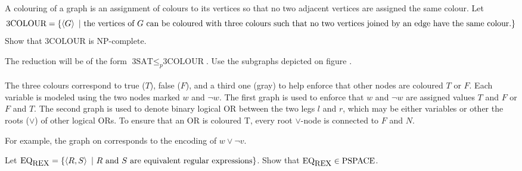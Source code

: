 \documentclass{article}
\begin{document}
\begin{exercise}
A colouring of a graph is an assignment of colours to its vertices so that no two adjacent vertices are assigned the same colour. Let
\begin{equation}
\mbox{3COLOUR}=\left\{ \left\langle G \right\rangle\ |\ \mbox{the vertices of $G$ can be coloured with three colours such that no two vertices joined by an edge have the same colour.} \right\}
\end{equation}
Show that $\mbox{3COLOUR}$ is $\mbox{NP-complete}$.
\begin{hint}
The reduction will be of the form $\mbox{3SAT}\leq_p\mbox{3COLOUR}$. Use the subgraphs depicted on figure \figref{}.
\paragraph{}
The three colours correspond to true ($T$), false ($F$), and a third one (gray) to help enforce that other nodes are coloured $T$ or $F$. Each variable is modeled using the two nodes marked $w$ and $\neg w$. The first graph is used to enforce that $w$ and $\neg w$ are assigned values $T$ and $F$ or $F$ and $T$. The second graph is used to denote binary logical OR between the two legs $l$ and $r$, which may be either variables or other the roots ($\vee$) of other logical ORs. To ensure that an OR is coloured T, every root $\vee$-node is connected to $F$ and $N$.
\begin{example}
For example, the graph on  corresponds to the encoding of $w\vee\neg v$.
\end{example}
\end{hint}
\end{exercise}

\begin{exercise}
Let $\mbox{EQ}_{\mbox{\small{REX}}}=\left\{ \left\langle R,S \right\rangle\ |\ \mbox{$R$ and $S$ are equivalent regular expressions} \right\}$. Show that $\mbox{EQ}_{\mbox{\small{REX}}}\in\mbox{PSPACE}$.
\end{exercise}
\end{document}
